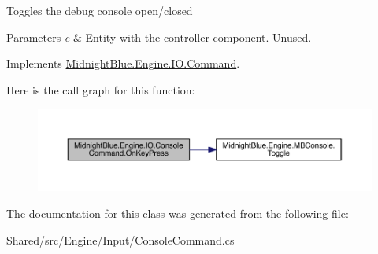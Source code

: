 Toggles the debug console open/closed 


\begin{DoxyParams}{Parameters}
{\em e} & Entity with the controller component. Unused.\\
\hline
\end{DoxyParams}


Implements \hyperlink{class_midnight_blue_1_1_engine_1_1_i_o_1_1_command_ae641d2c1a9db17f03ee6b7854b00a9d2}{Midnight\+Blue.\+Engine.\+I\+O.\+Command}.

Here is the call graph for this function\+:
\nopagebreak
\begin{figure}[H]
\begin{center}
\leavevmode
\includegraphics[width=350pt]{class_midnight_blue_1_1_engine_1_1_i_o_1_1_console_command_a603fc84ab28db867d9cc5143b95ebcb6_cgraph}
\end{center}
\end{figure}


The documentation for this class was generated from the following file\+:\begin{DoxyCompactItemize}
\item 
Shared/src/\+Engine/\+Input/Console\+Command.\+cs\end{DoxyCompactItemize}
